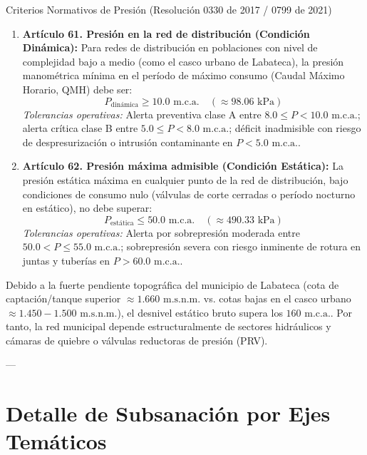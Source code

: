 \documentclass[11pt,letterpaper]{article}
\begin{document}
\begin{normabox}{Criterios Normativos de Presión (Resolución 0330 de 2017 / 0799 de 2021)}
\begin{enumerate}
    \item \textbf{Artículo 61. Presión en la red de distribución (Condición Dinámica):}
    Para redes de distribución en poblaciones con nivel de complejidad bajo a medio (como el casco urbano de Labateca), la presión manométrica mínima en el período de máximo consumo (Caudal Máximo Horario, QMH) debe ser:
    \begin{equation}
        P_{\text{dinámica}} \ge 10.0\text{ m.c.a.} \quad (\approx 98.06\text{ kPa})
    \end{equation}
    \textit{Tolerancias operativas:} Alerta preventiva clase A entre $8.0 \le P < 10.0\text{ m.c.a.}$; alerta crítica clase B entre $5.0 \le P < 8.0\text{ m.c.a.}$; déficit inadmisible con riesgo de despresurización o intrusión contaminante en $P < 5.0\text{ m.c.a.}$.

    \item \textbf{Artículo 62. Presión máxima admisible (Condición Estática):}
    La presión estática máxima en cualquier punto de la red de distribución, bajo condiciones de consumo nulo (válvulas de corte cerradas o período nocturno en estático), no debe superar:
    \begin{equation}
        P_{\text{estática}} \le 50.0\text{ m.c.a.} \quad (\approx 490.33\text{ kPa})
    \end{equation}
    \textit{Tolerancias operativas:} Alerta por sobrepresión moderada entre $50.0 < P \le 55.0\text{ m.c.a.}$; sobrepresión severa con riesgo inminente de rotura en juntas y tuberías en $P > 60.0\text{ m.c.a.}$.
\end{enumerate}
\end{normabox}

Debido a la fuerte pendiente topográfica del municipio de Labateca (cota de captación/tanque superior $\approx 1.660\text{ m.s.n.m.}$ vs. cotas bajas en el casco urbano $\approx 1.450 - 1.500\text{ m.s.n.m.}$), el desnivel estático bruto supera los $160\text{ m.c.a.}$. Por tanto, la red municipal depende estructuralmente de sectores hidráulicos y cámaras de quiebre o válvulas reductoras de presión (PRV).

---

\section{Detalle de Subsanación por Ejes Temáticos}
\end{document}
